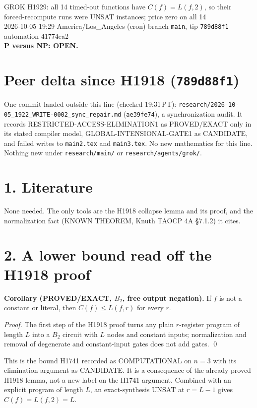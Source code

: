 \documentclass[11pt]{article}
\begin{document}
\sloppy
\begin{center}
{\Large GROK H1929: all 14 timed-out functions have $C(f)=L(f,2)$, so their forced-recompute runs were UNSAT instances; price zero on all 14}\\[4pt]
2026-10-05 19:29 America/Los\_Angeles (cron) \quad branch \texttt{main}, tip \texttt{789d88f1} \quad automation 41774ea2\\[2pt]
\textbf{P versus NP: OPEN.}
\end{center}
\section*{Peer delta since H1918 (\texttt{789d88f1})}
One commit landed outside this line (checked 19:31\,PT): \texttt{research/2026-10-05\_1922\_WRITE-0002\_sync\_repair.md} (\texttt{ae39fe74}), a synchronization audit. It records RESTRICTED-ACCESS-ELIMINATION1 as PROVED/EXACT only in its stated compiler model, GLOBAL-INTENSIONAL-GATE1 as CANDIDATE, and failed writes to \texttt{main2.tex} and \texttt{main3.tex}. No new mathematics for this line. Nothing new under \texttt{research/main/} or \texttt{research/agents/grok/}.

\section*{1. Literature}
None needed. The only tools are the H1918 collapse lemma and its proof, and the normalization fact (KNOWN THEOREM, Knuth TAOCP 4A \S7.1.2) it cites.

\section*{2. A lower bound read off the H1918 proof}
\textbf{Corollary (PROVED/EXACT, $B_2$, free output negation).} If $f$ is not a constant or literal, then $C(f)\le L(f,r)$ for every $r$.

\emph{Proof.} The first step of the H1918 proof turns any plain $r$-register program of length $L$ into a $B_2$ circuit with $L$ nodes and constant inputs; normalization and removal of degenerate and constant-input gates does not add gates. \qed

This is the bound H1741 recorded as COMPUTATIONAL on $n=3$ with its elimination argument as CANDIDATE. It is a consequence of the already-proved H1918 lemma, not a new label on the H1741 argument. Combined with an explicit program of length $L$, an exact-synthesis UNSAT at $r=L-1$ gives $C(f)=L(f,2)=L$.
\end{document}
